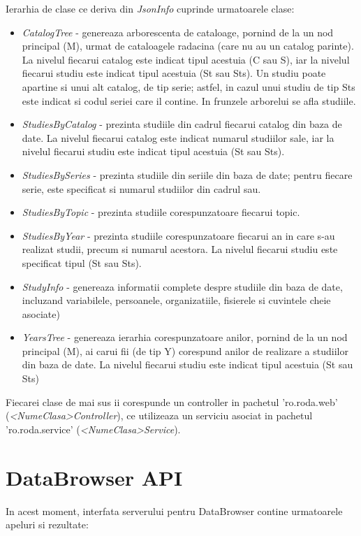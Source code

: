 Ierarhia de clase ce deriva din \emph{JsonInfo} cuprinde urmatoarele clase:
\begin{itemize}
\item
\emph{CatalogTree} - genereaza arborescenta de cataloage, pornind de la un nod principal (M), urmat de cataloagele radacina (care nu au un catalog parinte). La nivelul fiecarui catalog este indicat tipul acestuia (C sau S), iar la nivelul fiecarui studiu este indicat tipul acestuia (St sau Sts). Un studiu poate apartine si unui alt catalog, de tip serie; astfel, in cazul unui studiu de tip Sts este indicat si codul seriei care il contine. In frunzele arborelui se afla studiile.
\item
\emph{StudiesByCatalog} - prezinta studiile din cadrul fiecarui catalog din baza de date. La nivelul fiecarui catalog este indicat numarul studiilor sale, iar la nivelul fiecarui studiu este indicat tipul acestuia (St sau Sts). 
\item
\emph{StudiesBySeries} - prezinta studiile din seriile din baza de date; pentru fiecare serie, este specificat si numarul studiilor din cadrul sau. 
\item
\emph{StudiesByTopic} - prezinta studiile corespunzatoare fiecarui topic.
\item
\emph{StudiesByYear} - prezinta studiile corespunzatoare fiecarui an in care s-au realizat studii, precum si numarul acestora. La nivelul fiecarui studiu este specificat tipul (St sau Sts).
\item
\emph{StudyInfo} - genereaza informatii complete despre studiile din baza de date, incluzand variabilele, persoanele, organizatiile, fisierele si cuvintele cheie asociate) 
\item
\emph{YearsTree} - genereaza ierarhia corespunzatoare anilor, pornind de la un nod principal (M), ai carui fii (de tip Y) corespund anilor de realizare a studiilor din baza de date. La nivelul fiecarui studiu este indicat tipul acestuia (St sau Sts) 
\end{itemize}

Fiecarei clase de mai sus ii corespunde un controller in pachetul 'ro.roda.web' (\emph{<NumeClasa>Controller}), ce utilizeaza un serviciu asociat in pachetul 'ro.roda.service' (\emph{<NumeClasa>Service}).

\section{DataBrowser API}

In acest moment, interfata serverului pentru DataBrowser contine urmatoarele
apeluri si rezultate:

